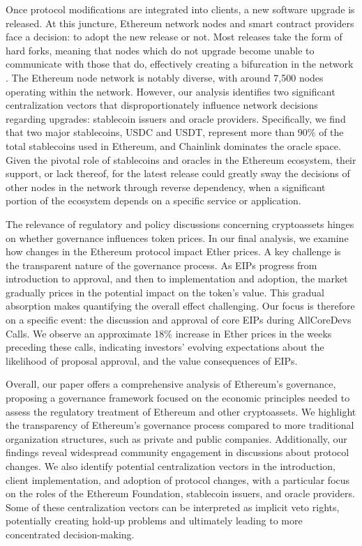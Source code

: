 \documentclass[No]{AEA}
\begin{document}
Once protocol modifications are integrated into clients, a new software upgrade is released. At this juncture, Ethereum network nodes and smart contract providers face a decision: to adopt the new release or not. Most releases take the form of hard forks, meaning that nodes which do not upgrade become unable to communicate with those that do, effectively creating a bifurcation in the network \citep{FS:20}. The Ethereum node network is notably diverse, with around 7,500 nodes operating within the network. However, our analysis identifies two significant centralization vectors that disproportionately influence network decisions regarding upgrades: stablecoin issuers and oracle providers. Specifically, we find that two major stablecoins, USDC and USDT, represent more than 90\% of the total stablecoins used in Ethereum, and Chainlink dominates the oracle space. Given the pivotal role of stablecoins and oracles in the Ethereum ecosystem, their support, or lack thereof, for the latest release could greatly sway the decisions of other nodes in the network through reverse dependency, when a significant portion of the ecosystem depends on a specific service or application. 

The relevance of regulatory and policy discussions concerning cryptoassets hinges on whether governance influences token prices. In our final analysis, we examine how changes in the Ethereum protocol impact Ether prices. A key challenge is the transparent nature of the governance process. As EIPs progress from introduction to approval, and then to implementation and adoption, the market gradually prices in the potential impact on the token’s value. This gradual absorption makes quantifying the overall effect challenging. Our focus is therefore on a specific event: the discussion and approval of core EIPs during AllCoreDevs Calls. We observe an approximate 18\% increase in Ether prices in the weeks preceding these calls, indicating investors' evolving expectations about the likelihood of proposal approval, and the value consequences of EIPs. 

Overall, our paper offers a comprehensive analysis of Ethereum's governance, proposing a governance framework focused on the economic principles needed to assess the regulatory treatment of Ethereum and other cryptoassets. We highlight the transparency of Ethereum's governance process compared to more traditional organization structures, such as private and public companies. Additionally, our findings reveal widespread community engagement in discussions about protocol changes. We also identify potential centralization vectors in the introduction, client implementation, and adoption of protocol changes, with a particular focus on the roles of the Ethereum Foundation, stablecoin issuers, and oracle providers. Some of these centralization vectors can be interpreted as implicit veto rights, potentially creating hold-up problems and ultimately leading to more concentrated decision-making.
\end{document}
